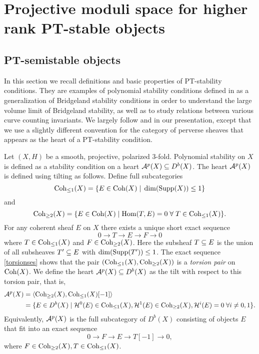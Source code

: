 \chapter{Projective moduli space for higher rank PT-stable objects}

\section{PT-semistable objects}
In this section we recall definitions and basic properties of PT-stability conditions. They are examples of polynomial stability conditions defined in \cite{bayer-polynomial} as a generalization of Bridgeland stability conditions in order to understand the large volume limit of Bridgeland stability, as well as to study relations between various curve counting invariants. We largely follow \cite{lo-PT1} and \cite{lo-PT2} in our presentation, except that we use a slightly different convention for the category of perverse sheaves that appears as the heart of a PT-stability condition.

Let $(X, H)$ be a smooth, projective, polarized 3-fold. Polynomial stability on $X$ is defined as a stability condition on a heart $\mathcal{A}^p(X) \subseteq D^b(X)$. The heart $\mathcal{A}^p(X)$ is defined using tilting as follows. Define full subcategories
\[ \operatorname{\mathrm{Coh}}_{\le 1}(X) = \{ E \in \operatorname{\mathrm{Coh}}(X) \;|\; \dim(\operatorname{\mathrm{Supp}}(X)) \le 1 \} \]
and
\[ \operatorname{\mathrm{Coh}}_{\ge 2}(X) = \{ E \in \operatorname{\mathrm{Coh}}(X) \;|\; \mathrm{Hom}(T,E) = 0 \; \forall \; T \in \operatorname{\mathrm{Coh}}_{\le 1}(X) \}. \]
For any coherent sheaf $E$ on $X$ there exists a unique short exact sequence
\begin{equation}\label{torsionses}
    0 \to T \to E \to F \to 0
\end{equation} 
where $T \in \operatorname{\mathrm{Coh}}_{\le 1}(X)$ and $F \in \operatorname{\mathrm{Coh}}_{\ge 2}(X)$. Here the subsheaf $T \subseteq E$ is the union of all subsheaves $T' \subseteq E$ with $\dim(\operatorname{\mathrm{Supp}}(T')) \le 1$. The exact sequence \eqref{torsionses} shows that the pair $(\operatorname{\mathrm{Coh}}_{\le 1}(X), \operatorname{\mathrm{Coh}}_{\ge 2}(X))$ is a \emph{torsion pair} on $\operatorname{\mathrm{Coh}}(X)$. We define the heart $\mathcal{A}^p(X) \subseteq D^b(X)$ as the tilt with respect to this torsion pair, that is,
\begin{align}\label{perverseheart}
    \mathcal{A}^p(X) & = \langle \operatorname{\mathrm{Coh}}_{\ge 2}(X), \operatorname{\mathrm{Coh}}_{\le 1}(X)[-1] \rangle \\
             & = \{ E \in D^b(X) \;|\; \mathcal{H}^0(E) \in \operatorname{\mathrm{Coh}}_{\le 1}(X), \mathcal{H}^1(E) \in \operatorname{\mathrm{Coh}}_{\ge 2}(X), \mathcal{H}^i(E) = 0 \;\forall i \neq 0,1 \}. \nonumber
\end{align}
Equivalently, $\mathcal{A}^p(X)$ is the full subcategory of $D^b(X)$ consisting of objects $E$ that fit into an exact sequence
\[ 0 \to F \to E \to T[-1] \to 0, \]
where $F \in \operatorname{\mathrm{Coh}}_{\ge 2}(X), T \in \operatorname{\mathrm{Coh}}_{\le 1}(X)$.

